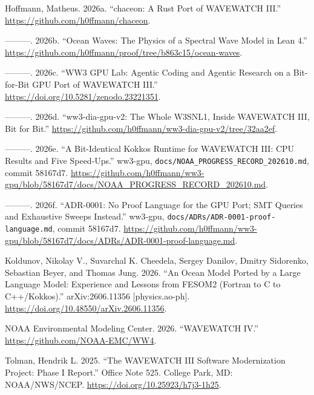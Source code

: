 \documentclass[10pt,a4paper,]{article}
\newlength{\cslhangindent}
\newenvironment{CSLReferences}[2] %
 {\small\begin{list}{}{%
  \setlength{\itemindent}{0pt}
  \setlength{\leftmargin}{0pt}
  \setlength{\parsep}{0pt}
  \ifodd #1
   \setlength{\leftmargin}{\cslhangindent}
   \setlength{\itemindent}{-1\cslhangindent}
  \fi
  \setlength{\itemsep}{#2\baselineskip}}}
 {\end{list}}
\begin{document}
\protect{}\label{refs}
\begin{CSLReferences}{1}{0}
Hoffmann, Matheus. 2026a. {``{chaceon}: A {Rust} Port of {WAVEWATCH
III}.''} \url{https://github.com/h0ffmann/chaceon}.

---------. 2026b. {``Ocean Waves: The Physics of a Spectral Wave Model
in {Lean} 4.''}
\url{https://github.com/h0ffmann/proof/tree/b863c15/ocean-waves}.

---------. 2026c. {``{WW3 GPU Lab}: Agentic Coding and Agentic Research
on a Bit-for-Bit {GPU} Port of {WAVEWATCH III}.''}
\url{https://doi.org/10.5281/zenodo.23221351}.

---------. 2026d. {``{ww3-dia-gpu-v2}: The Whole {W3SNL1}, Inside
{WAVEWATCH III}, Bit for Bit.''}
\url{https://github.com/h0ffmann/ww3-dia-gpu-v2/tree/32aa2ef}.

---------. 2026e. {``A Bit-Identical {Kokkos} Runtime for {WAVEWATCH
III}: {CPU} Results and Five Speed-Ups.''} ww3-gpu,
\texttt{docs/NOAA\_PROGRESS\_RECORD\_202610.md}, commit 58167d7.
\url{https://github.com/h0ffmann/ww3-gpu/blob/58167d7/docs/NOAA_PROGRESS_RECORD_202610.md}.

---------. 2026f. {``{ADR-0001}: No Proof Language for the {GPU} Port;
{SMT} Queries and Exhaustive Sweeps Instead.''} ww3-gpu,
\texttt{docs/ADRs/ADR-0001-proof-language.md}, commit 58167d7.
\url{https://github.com/h0ffmann/ww3-gpu/blob/58167d7/docs/ADRs/ADR-0001-proof-language.md}.

Koldunov, Nikolay V., Suvarchal K. Cheedela, Sergey Danilov, Dmitry
Sidorenko, Sebastian Beyer, and Thomas Jung. 2026. {``An Ocean Model
Ported by a Large Language Model: Experience and Lessons from {FESOM2}
({Fortran} to {C} to {C++/Kokkos}).''} arXiv:2606.11356
{[}physics.ao-ph{]}. \url{https://doi.org/10.48550/arXiv.2606.11356}.

NOAA Environmental Modeling Center. 2026. {``{WAVEWATCH IV}.''}
\url{https://github.com/NOAA-EMC/WW4}.

Tolman, Hendrik L. 2025. {``The {WAVEWATCH III} Software Modernization
Project: Phase {I} Report.''} Office Note 525. College Park, MD:
NOAA/NWS/NCEP. \url{https://doi.org/10.25923/h7j3-1h25}.

\end{CSLReferences}
\end{document}
